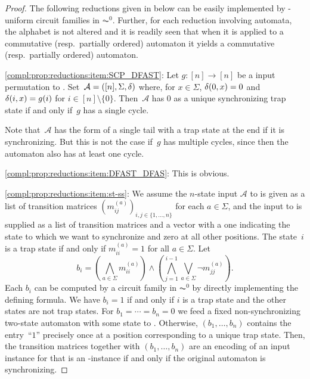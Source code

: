 \begin{proof}  	
	The following reductions given in 
	below can be easily implemented by \LOGSPACE-uniform circuit families
	in $\AC^0$. Further, for each reduction involving automata, the alphabet is not altered and 
	it is readily seen that when it is applied to a commutative (resp.~partially ordered)
	automaton it yields a commutative (resp.~partially ordered) automaton.
		
	\ref{compl:prop:reductions:item:SCP_DFAST}: 
	Let $g \colon [n] \to [n]$ be a input permutation to \SCP. 
	Set~$\semiautomat{A}{[n]}{\Sigma}{\delta}$
	where, for $x \in \Sigma$,
	$\applytrans{\delta}{0}{x} = 0$
	and $\applytrans{\delta}{i}{x} = \applyfunc{i}{g}$
	for $i \in [n] \setminus \{0\}$.
	Then~$\mathcal A$ has $0$ as a unique synchronizing trap state if and only if~$g$ has a single cycle.	
	
	Note that~$\mathcal A$ has the form of a single tail with a trap state at the end
	if it is synchronizing. But this is not the case 
	if~$g$ has multiple cycles, since then
	the automaton also has at least one cycle.
		
	\ref{compl:prop:reductions:item:DFAST_DFAS}: This is obvious.	 
	
	\ref{compl:prop:reductions:item:st-ss}:	
	We assume the $n$-state input $\mathcal A$ to \DFAST is given as a list 
	of transition matrices $(m_{ij}^{(a)})_{i,j \in \{1,\ldots,n\}}$
	for each $a \in \Sigma$,
	and the input to \DFASS  
	is supplied as a list of transition
	matrices and a vector
	with a one indicating the state to which we want to synchronize
	and zero at all other positions.
	The state~$i$ is a trap state if and only if $m_{ii}^{(a)} = 1$
	for all $a \in \Sigma$.
	Let 
	\[
	b_i = \left( \bigwedge_{a \in \Sigma} m_{ii}^{(a)} \right) 
	\land 
	\left(\bigwedge_{j=1}^{i-1} \bigvee_{a \in \Sigma} \neg m_{jj}^{(a)} \right).
	\]
	Each $b_i$ can be computed by a circuit family in $\AC^0$ 
	by directly implementing the defining formula.
	We have $b_i = 1$ if and only if $i$ is a trap state
	and the other states are not trap states. 
	For $b_1 = \cdots = b_n = 0$ we feed a fixed non-synchronizing two-state automaton
	with some state to \DFASS. 
	Otherwise, $(b_1, \ldots, b_n)$ contains the entry~``$1$'' precisely once at a position corresponding to a unique trap state.	
	Then, the transition matrices together with $(b_1, \ldots, b_n)$ 
	are an encoding of an input instance for \DFASS
	that is an \rYES-instance if and only if the original automaton
	is synchronizing.	
		

\end{proof}
